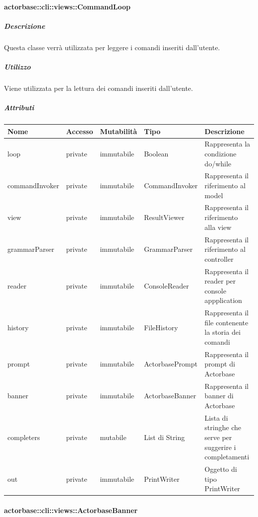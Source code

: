 \documentclass{scalatekids-article}
\begin{document}
\paragraph{actorbase::cli::views::CommandLoop}
\label{sec:actorbase::cli::views::CommandLoop}

\subparagraph{Descrizione}
Questa classe verrà utilizzata per leggere i comandi inseriti dall'utente.

\subparagraph{Utilizzo}
Viene utilizzata per la lettura dei comandi inseriti dall'utente.

\subparagraph{Attributi}
\begin{tabular}{| p{2.5cm} | p{1.5cm} | p{2cm} | p{2.5cm} | p{8.5cm} |}
  \hline
  Nome & Accesso & Mutabilità & Tipo & Descrizione\\
  \hline
  loop & private & immutabile & Boolean & Rappresenta la condizione do/while\\
  \hline
  commandInvoker & private & immutabile & CommandInvoker & Rappresenta il riferimento al model\\
  \hline
  view & private & immutabile & ResultViewer & Rappresenta il riferimento alla view\\
  \hline
  grammarParser & private & immutabile & GrammarParser & Rappresenta il riferimento al controller\\
  \hline
  reader & private & immutabile & ConsoleReader & Rappresenta il reader per console appplication \\
  \hline
  history & private & immutabile & FileHistory & Rappresenta il file contenente la storia dei comandi\\
  \hline
  prompt & private & immutabile & ActorbasePrompt & Rappresenta il prompt di Actorbase\\
  \hline
  banner & private & immutabile & ActorbaseBanner & Rappresenta il banner di Actorbase\\
  \hline
  completers & private & mutabile & List di String & Lista di stringhe che serve per suggerire i completamenti\\
  \hline
  out & private & immutabile & PrintWriter & Oggetto di tipo PrintWriter\\
  \hline
\end{tabular}

\paragraph{actorbase::cli::views::ActorbaseBanner}
\label{sec:actorbase::cli::views::ActorbaseBanner}
\end{document}
